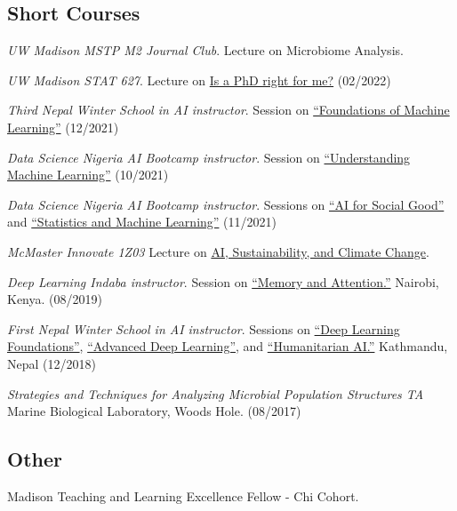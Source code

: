 \documentclass[letterpaper]{article}
\renewenvironment{itemize}{
  \begin{list}{}{
    \setlength{\leftmargin}{1.5em}
  }
}{
  \end{list}
}
\begin{document}
\subsection*{Short Courses}
\begin{itemize}
\item \textit{UW Madison MSTP M2 Journal Club}. Lecture on Microbiome Analysis.
\item \textit{UW Madison STAT 627}. Lecture on \href{https://drive.google.com/file/d/1kq0xJ3XS98igzxFcJOTFUEz2DtoRByCg/view?usp=sharing}{Is a PhD right for me?} (02/2022)
\item \textit{Third Nepal Winter School in AI instructor}. Session on
\href{https://krisrs1128.github.io/winter_school_2021/index.html}{``Foundations
of Machine Learning''} (12/2021)
\item \textit{Data Science Nigeria AI Bootcamp instructor}.
Session on \href{https://drive.google.com/file/d/1bgYQb8z1iCjHyOG1gVWeJJCSPdssndVP/view}{``Understanding Machine Learning''} (10/2021)
\item \textit{Data Science Nigeria AI Bootcamp instructor}.
Sessions on \href{https://www.youtube.com/watch?v=7_8DUN-6tpI&}{``AI for Social Good''} and \href{https://www.youtube.com/watch?v=EefWzpRkIVM}{``Statistics and Machine Learning''} (11/2021)
\item \textit{McMaster Innovate 1Z03} Lecture on
\href{https://docs.google.com/presentation/d/1JWV8_VXYzCzipr6EJZdcdaPY5pz2Cp4F/edit#slide=id.p1}{AI,
Sustainability, and Climate Change}.
\item \textit{Deep Learning Indaba instructor}.
Session on \href{https://www.youtube.com/watch?v=9mWYFZwNpis}{``Memory and Attention.''}
Nairobi, Kenya. (08/2019)
\item \textit{First Nepal Winter School in AI instructor}.
Sessions on \href{https://www.youtube.com/watch?v=3lBMxO2zmGg}{``Deep Learning Foundations''}, \href{https://www.youtube.com/watch?v=OLaX-jmRUwY}{``Advanced Deep Learning''}, and \href{https://www.youtube.com/watch?v=RXZyGwa4TpY}{``Humanitarian AI.''}
Kathmandu, Nepal (12/2018)
\item \textit{Strategies and Techniques for Analyzing Microbial Population Structures TA}
  Marine Biological Laboratory, Woods Hole.
  (08/2017)
\end{itemize}

\subsection*{Other}
\begin{itemize}
\item Madison Teaching and Learning Excellence Fellow - Chi Cohort.
\end{itemize}
\end{document}
